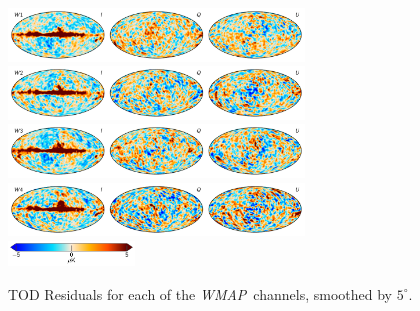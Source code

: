 \documentclass[twocolumn]{../../common/aa}
\def\WMAP{\emph{WMAP}}
\begin{document}
\begin{figure}
	\includegraphics[width=0.7\textwidth]{figures/tod_res_W1_IQU.pdf}\\
	\includegraphics[width=0.7\textwidth]{figures/tod_res_W2_IQU.pdf}\\
	\includegraphics[width=0.7\textwidth]{figures/tod_res_W3_IQU.pdf}\\
	\includegraphics[width=0.7\textwidth]{figures/tod_res_W4_IQU.pdf}\\
	\includegraphics[width=0.30\textwidth]{figures/cbar_5uK.pdf}
	\caption{TOD Residuals for each of the \WMAP\ channels, smoothed by $5^\circ$.}
\end{figure}
\end{document}
